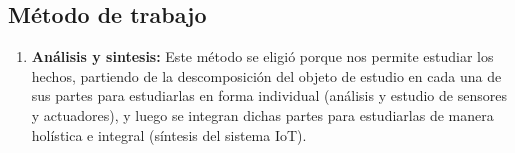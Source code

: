 \documentclass[a4paper, 12pt]{article}
\begin{document}
\subsection{Método de trabajo}
\begin{enumerate}



\item{\bf Análisis y sintesis:} Este método se eligió porque nos permite estudiar los hechos, partiendo de la descomposición del objeto de estudio en cada una de sus partes para estudiarlas en forma individual (análisis y estudio de sensores y actuadores), y luego se integran dichas partes para estudiarlas de manera holística e integral (síntesis del sistema IoT).
\end{enumerate}
\end{document}
